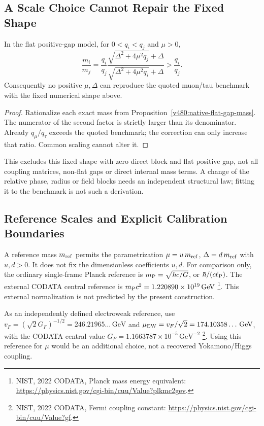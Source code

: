 \subsection{A Scale Choice Cannot Repair the Fixed Shape}

\begin{proposition}
\label{v480:coupling-gap-ratio-obstruction}
In the flat positive-gap model, for $0<q_i<q_j$ and $\mu>0$,
\[
 \frac{m_i}{m_j}
 =\frac{q_i}{q_j}
  \frac{\sqrt{\Delta^2+4\mu^2q_j}+\Delta}
       {\sqrt{\Delta^2+4\mu^2q_i}+\Delta}
 >\frac{q_i}{q_j}.
\]
Consequently no positive $\mu,\Delta$ can reproduce the quoted
muon/tau benchmark with the fixed numerical shape above.
\end{proposition}
\begin{proof}
Rationalize each exact mass from
Proposition~\ref{v480:native-flat-gap-mass}. The numerator of the
second factor is strictly larger than its denominator. Already
$q_\mu/q_\tau$ exceeds the quoted benchmark; the correction can
only increase that ratio. Common scaling cannot alter it.
\end{proof}

This excludes this fixed shape with zero direct block and flat
positive gap, not all coupling matrices, non-flat gaps or direct
internal mass terms. A change of the relative phase, radius or
field blocks needs an independent structural law; fitting it to
the benchmark is not such a derivation.

\subsection{Reference Scales and Explicit Calibration Boundaries}
\label{v480:coupling-scale-reference}

A reference mass $m_{\rm ref}$ permits the parametrization
$\mu=u\,m_{\rm ref}$, $\Delta=d\,m_{\rm ref}$ with $u,d>0$.
It does not fix the dimensionless coefficients $u,d$.
For comparison only, the ordinary single-frame Planck reference is
$m_{\rm P}=\sqrt{\hbar c/G}$, or $\hbar/(c\ell_{\rm P})$.
The external CODATA central reference is
$m_{\rm P}c^2=1.220890\times10^{19}\,\mathrm{GeV}$
\footnote{NIST, 2022 CODATA, Planck mass energy equivalent:
\url{https://physics.nist.gov/cgi-bin/cuu/Value?plkmc2gev}.}.
This external normalization is not predicted by the present construction.

As an independently defined electroweak reference, use
$v_F=(\sqrt2G_F)^{-1/2}=246.21965\ldots\,\mathrm{GeV}$ and
$\mu_{\rm EW}=v_F/\sqrt2=174.10358\ldots\,\mathrm{GeV}$,
with the CODATA central value
$G_F=1.1663787\times10^{-5}\,\mathrm{GeV}^{-2}$
\footnote{NIST, 2022 CODATA, Fermi coupling constant:
\url{https://physics.nist.gov/cgi-bin/cuu/Value?gf}.}.
Using this reference for $\mu$ would be an additional choice,
not a recovered Yokamono/Higgs coupling.

